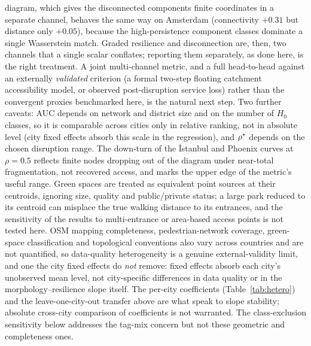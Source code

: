 diagram, which gives the disconnected components finite coordinates in a separate
channel, behaves the same way on Amsterdam (connectivity $+0.31$ but distance only
$+0.05$), because the high-persistence component classes dominate a single
Wasserstein match. Graded resilience and disconnection are, then, two channels that
a single scalar conflates; reporting them separately, as done here, is the right
treatment. A joint multi-channel metric, and a full head-to-head against an
externally \emph{validated} criterion (a formal two-step floating catchment
accessibility model, or observed post-disruption service loss) rather than the
convergent proxies benchmarked here, is the natural next step. Two further
caveats:
AUC depends on network and district size and on the number of $H_0$ classes, so it
is comparable across cities only in relative ranking, not in absolute level (city
fixed effects absorb this scale in the regression), and $\rho^{*}$ depends on the
chosen disruption range. The down-turn of the İstanbul and Phoenix curves at
$\rho=0.5$ reflects finite nodes dropping out of the diagram under near-total
fragmentation, not recovered access, and marks the upper edge of the metric's
useful range. Green spaces are treated as equivalent point sources at their
centroids, ignoring size, quality and public/private status; a large park reduced to
its centroid can misplace the true walking distance to its entrances, and the
sensitivity of the results to multi-entrance or area-based access points is not
tested here. OSM mapping completeness, pedestrian-network coverage, green-space classification and
topological conventions also vary across countries and are not quantified, so
data-quality heterogeneity is a genuine external-validity limit, and one the city fixed
effects do \emph{not} remove: fixed effects absorb each city's unobserved mean level,
not city-specific differences in data quality or in the morphology--resilience slope
itself. The per-city coefficients (Table~\ref{tab:hetero}) and the leave-one-city-out
transfer above are what speak to slope stability; absolute cross-city comparison of
coefficients is not warranted.
The class-exclusion sensitivity below addresses the tag-mix concern but not these
geometric and completeness ones.

